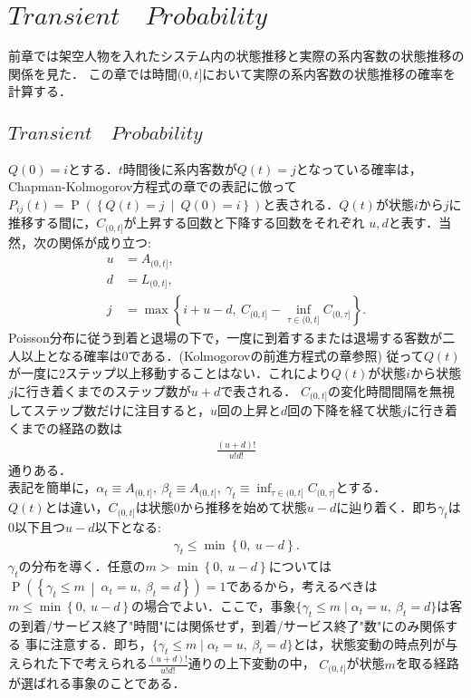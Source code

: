 \documentclass[a4j,papersize,disablejfam,slide,14pt]{jsarticle}
\def\max#1#2{\operatorname{max} \left\{ #1,\ #2 \right\}} %
\def\min#1#2{\operatorname{min} \left\{ #1,\ #2 \right\}} %
\def\inf#1#2{\operatorname*{inf}_{#1} #2 } %
\def\cprob#1#2{\operatorname{P} \left(\left\{ #1 \ \middle|\ #2 \right\}\right)} %
\begin{document}
\section{$Transient\quad Probability$}
	前章では架空人物を入れたシステム内の状態推移と実際の系内客数の状態推移の関係を見た．
	この章では時間$(0,t]$において実際の系内客数の状態推移の確率を計算する．

\subsection{$Transient\quad Probability$}
\label{sec:transient_prob}
    $Q(0)=i$とする．$t$時間後に系内客数が$Q(t)=j$となっている確率は，{\rm Chapman-Kolmogorov}方程式の章での表記に倣って
    $P_{ij}(t) = \cprob{Q(t)=j}{Q(0)=i}$と表される．$Q(t)$が状態$i$から$j$に推移する間に，$C_{(0, t]}$が上昇する回数と下降する回数をそれぞれ
    $u,d$と表す．当然，次の関係が成り立つ:
    \begin{align}
    	u &= A_{(0, t]}, \\
        d &= L_{(0, t]}, \\
    	j &= \max{i + u - d}{C_{(0, t]} - \inf{\tau \in (0, t]}{C_{(0, \tau]}}}. 
    \end{align}
    {\rm Poisson}分布に従う到着と退場の下で，一度に到着するまたは退場する客数が二人以上となる確率は$0$である．({\rm Kolmogorov}の前進方程式の章参照)
    従って$Q(t)$が一度に$2$ステップ以上移動することはない．これにより$Q(t)$が状態$i$から状態$j$に行き着くまでのステップ数が$u+d$で表される．
    $C_{(0, t]}$の変化時間間隔を無視してステップ数だけに注目すると，$u$回の上昇と$d$回の下降を経て状態$j$に行き着くまでの経路の数は
    \begin{align}
    	\frac{(u+d)!}{u!d!}
    \end{align}
    通りある．\\
    表記を簡単に，$\alpha_t \equiv A_{(0, t]},\ \beta_t \equiv A_{(0, t]},\ \gamma_t \equiv \inf{\tau \in (0, t]}{C_{(0, \tau]}}$とする．\\
    $Q(t)$とは違い，$C_{(0, t]}$は状態$0$から推移を始めて状態$u - d$に辿り着く．即ち$\gamma_t$は$0$以下且つ$u-d$以下となる:
    \begin{align}
    	\gamma_t \leq \min{0}{u - d}.
    \end{align}
    $\gamma_t$の分布を導く．任意の$m > \min{0}{u - d}$については$\cprob{\gamma_t \leq m}{\alpha_t = u,\ \beta_t = d} = 1$であるから，考えるべきは
    $m \leq \min{0}{u - d}$の場合でよい．ここで，事象$\{ \gamma_t \leq m \mid \alpha_t = u,\ \beta_t = d \}$は客の到着/サービス終了"時間"には関係せず，到着/サービス終了"数"にのみ関係する
    事に注意する．即ち，$\{ \gamma_t \leq m \mid \alpha_t = u,\ \beta_t = d \}$とは，状態変動の時点列が与えられた下で考えられる$\frac{(u+d)!}{u!d!}$通りの上下変動の中，
    $C_{(0, t]}$が状態$m$を取る経路が選ばれる事象のことである．
    
\end{document}
